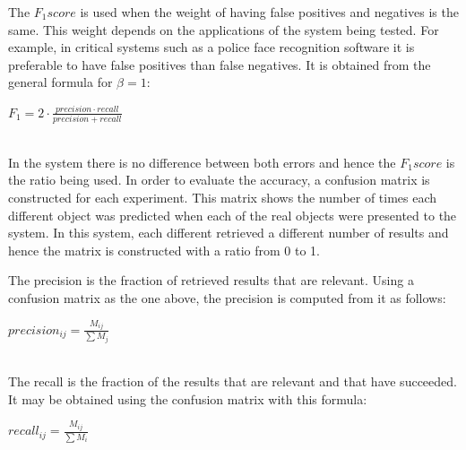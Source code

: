 \begin{itemize}

		The $F_1 score$ is used when the weight of having false positives and negatives is the same. 
		This weight depends on the applications of the system being tested. 
		For example, in critical systems such as a police face recognition software it is preferable to have false positives than false negatives. 
		It is obtained from the general formula for $\beta=1$: 	
		\\
		\begin{center}
		$F_1=2\cdot\frac{precision \cdot recall}{precision + recall}$
		\end{center}

		\\

		In the system there is no difference between both errors and hence the $F_1 score$ is the ratio being used. 
		In order to evaluate the accuracy, a confusion matrix is constructed for each experiment. 
		This matrix shows the number of times each different object was predicted when each of the real objects were presented to the system. 
		In this system, each different retrieved a different number of results and hence the matrix is constructed with a ratio from 0 to 1. 





		The precision is the fraction of retrieved results that are relevant.  
		Using a confusion matrix as the one above, the precision is computed from it as follows: 
		\\
		\begin{center}
		$precision_{ij}=\frac{M_{ij}}{\sum M_j}$
		\end{center}

		\\

		The recall is the fraction of the results that are relevant and that have succeeded. 
		It may be obtained using the confusion matrix with this formula: 
		\\
		\begin{center}
		$recall_{ij}=\frac{M_{ij}}{\sum M_i}$
		\end{center}
		\\	


\end{itemize}
